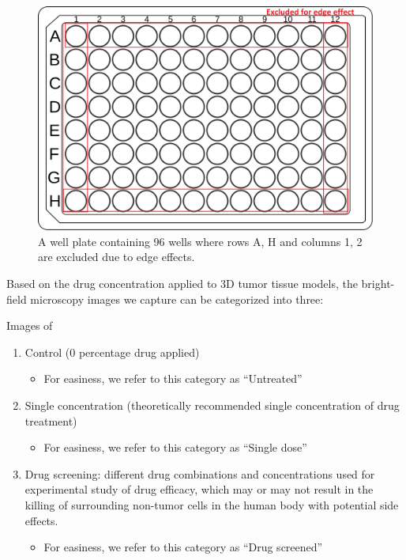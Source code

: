 \begin{figure}[H]
  \centering
  \includegraphics[width=0.9\linewidth]{figures/WellPlate.png} %
  \caption{A well plate containing 96 wells where rows A, H and columns 1, 2 are excluded due to edge effects.}
  \label{fig:Wellplate}
\end{figure}





Based on the drug concentration applied to 3D tumor tissue models, the bright-field microscopy images we capture can be categorized into three:

Images of

\begin{enumerate}
  \item Control (0 percentage drug applied)
        \begin{itemize}
            \item For easiness, we refer to this category as ``Untreated''
        \end{itemize}
  
  \item Single concentration (theoretically recommended single concentration of drug treatment)
        \begin{itemize}
            \item For easiness, we refer to this category as ``Single dose''
        \end{itemize}
  \item Drug screening: different drug combinations and concentrations used for experimental study of drug efficacy, which may or may not result in the killing of surrounding non-tumor cells in the human body with potential side effects.
        \begin{itemize}
            \item For easiness, we refer to this category as ``Drug screened''
        \end{itemize}
\end{enumerate}


